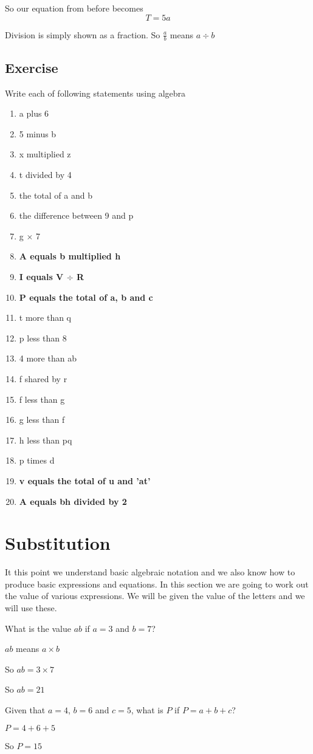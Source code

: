\noindent So our equation from before becomes $$T = 5a$$

\noindent Division is simply shown as a fraction.  So $\frac{a}{b}$ means $a \div b$
\subsection{Exercise}
Write each of following statements using algebra
\begin{multicols}{2}
\begin{enumerate}
  \item a plus 6
  \item 5 minus b
  \item x multiplied z
  \item t divided by 4
  \item the total of a and b
  \item the difference between 9 and p
  \item g $\times$ 7
  \item \textbf{A equals b multiplied h}
  \item \textbf{I equals V $\div$ R}
  \item \textbf{P equals the total of a, b and c}
  \item t more than q
  \item p less than 8
  \item 4 more than ab
  \item f shared by r
  \item f less than g
  \item g less than f
  \item h less than pq
  \item p times d
  \item \textbf{v equals the total of u and 'at'}
  \item \textbf{A equals bh divided by 2}
\end{enumerate}
\end{multicols}
\section{Substitution}
It this point we understand basic algebraic notation and we also know how to produce basic expressions and equations.  In this section we are going to work out the value of various expressions.  We will be given the value of the letters and we will use these.
\begin{exmp}
What is the value $ab$ if $a=3$ and $b=7$?

$ab$ means $a \times b$

So $ab = 3 \times 7$

So $ab = 21$
\end{exmp}
\begin{exmp}
Given that $a= 4$, $b = 6$ and $c= 5$, what is $P$ if $P=a+b+c$?

$P=4+6+5$

So $P=15$
\end{exmp}
